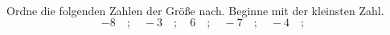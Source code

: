 \begin{aufgabe} ~ \\ 
Ordne die folgenden Zahlen der Gr\"o\ss{}e nach. Beginne mit der kleinsten Zahl.\[-8\quad ; \quad-3\quad ; \quad6\quad ; \quad-7\quad ; \quad-4\quad ; \quad\]\end{aufgabe} 
